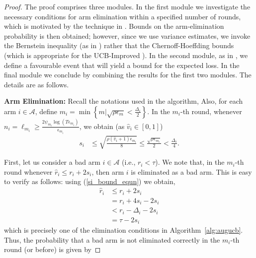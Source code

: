 \begin{proof}
The proof comprises three modules. In the first module we investigate the necessary conditions for arm elimination within a specified number of rounds, which is motivated by the technique in \cite{}. Bounds on the arm-elimination probability is then obtained; however, since we use variance estimates, we invoke the Bernstein inequality (as in \cite{}) rather that the Chernoff-Hoeffding bounds (which is appropriate for the UCB-Improved \cite{}). In the second module, as in \cite{}, we define a favourable event that will yield a bound for the expected loss. In the final module we conclude by combining the results for the first two modules. The details are as follows. 


\textbf{Arm Elimination:} Recall the notations used in the algorithm, Also, for each arm $i\in\mathcal{A}$, define $m_{i}=\min\left\lbrace m| \sqrt{\rho\epsilon_{m}}<\frac{\Delta_{i}}{2}\right\rbrace$. In the $m_i$-th round, whenever $n_i=\ell_{m_i}\ge\frac{2\psi_{m_i}\log{(T\epsilon_{m_{i}})}}{\epsilon_{m_{i}}}$, we obtain (as $\hat{v}_i\in[0,1]$)
%
%
\begin{align}
\label{si_bound_equn}
s_i 
&\le \sqrt{\frac{\rho(\hat{v}_i+1)\epsilon_{m_i}}{8}}
  \le \frac{\sqrt{\rho\epsilon_{m_i}}}{2} < \frac{\Delta_i}{4}.
\end{align}

First, let us consider a bad arm $i\in\mathcal{A}$ (i.e., $r_i<\tau$). We note that, in the $m_i$-th round  whenever 
$\hat{r}_i \le r_i +2s_i$, then arm $i$ is eliminated as a bad arm. This is easy to verify as follows: using (\ref{si_bound_equn}) we obtain,
\begin{align*}
\hat{r}_{i}&\leq r_{i} + 2s_{i} \\
&= r_{i} + 4s_{i} - 2s_{i} \\
&< r_{i} - \Delta_{i} - 2s_{i} \\
&= \tau - 2s_{i} %
\end{align*}
which is precisely one of the elimination conditions in Algorithm~\ref{alg:augucb}. Thus, the probability that a bad arm is not eliminated correctly in the $m_i$-th round (or before) is given by


\end{proof}

